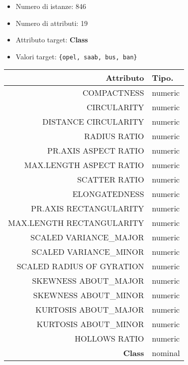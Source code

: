 
\begin{itemize}
	\item Numero di istanze: 846 
	\item Numero di attributi: 19
	\item Attributo target:  \textbf{Class}
	\item Valori target: \texttt{\{opel, saab, bus, ban\}}
\end{itemize}


\begin{table}[!htb]
	\centering
	\begin{tabular}{|r|l|}
		\hline
		Attributo & Tipo. \\ 
		\hline
		COMPACTNESS & numeric \\ 
		CIRCULARITY & numeric \\ 
		DISTANCE CIRCULARITY & numeric \\ 
		RADIUS RATIO & numeric \\ 
		PR.AXIS ASPECT RATIO & numeric \\ 
		MAX.LENGTH ASPECT RATIO & numeric \\ 
		SCATTER RATIO & numeric \\ 
		ELONGATEDNESS & numeric \\ 
		PR.AXIS RECTANGULARITY & numeric \\ 
		MAX.LENGTH RECTANGULARITY & numeric \\ 
		SCALED VARIANCE\_MAJOR & numeric \\ 
		SCALED VARIANCE\_MINOR & numeric \\ 
		SCALED RADIUS OF GYRATION & numeric \\ 
		SKEWNESS ABOUT\_MAJOR & numeric \\ 
		SKEWNESS ABOUT\_MINOR & numeric \\ 
		KURTOSIS ABOUT\_MAJOR & numeric \\ 
		KURTOSIS ABOUT\_MINOR & numeric \\ 
		HOLLOWS RATIO & numeric \\ 
		\textbf{Class} & nominal \\ 
		\hline
	\end{tabular}
\end{table}

